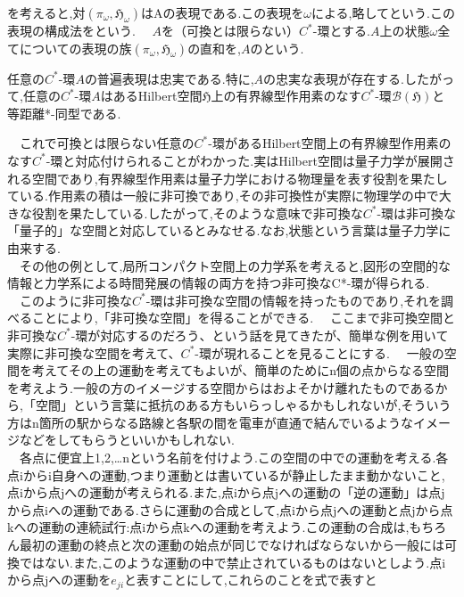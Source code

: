 を考えると,対$\left(\pi_{\omega},\mathfrak{H}_{\omega}\right)$はAの表現である.この表現を$\omega$による,略してという.この表現の構成法をという.
　$A$を（可換とは限らない）$C^*$-環とする.$A$上の状態$\omega$全てについての表現の族$\left(\pi_{\omega},\mathfrak{H}_{\omega}\right)$の直和を,$A$のという.
\begin{theo}
任意の$C^*$-環$A$の普遍表現は忠実である.特に,$A$の忠実な表現が存在する.したがって,任意の$C^*$-環$A$はある{\rm Hilbert}空間$\mathfrak{H}$上の有界線型作用素のなす$C^*$-環$\mathcal{B}\left(\mathfrak{H}\right)$と等距離*-同型である.
\end{theo}
　これで可換とは限らない任意の$C^*$-環があるHilbert空間上の有界線型作用素のなす$C^*$-環と対応付けられることがわかった.実はHilbert空間は量子力学が展開される空間であり,有界線型作用素は量子力学における物理量を表す役割を果たしている.作用素の積は一般に非可換であり,その非可換性が実際に物理学の中で大きな役割を果たしている.したがって,そのような意味で非可換な$C^*$-環は非可換な「量子的」な空間と対応しているとみなせる.なお,状態という言葉は量子力学に由来する.\\
　その他の例として,局所コンパクト空間上の力学系を考えると,図形の空間的な情報と力学系による時間発展の情報の両方を持つ非可換なC*-環が得られる.\\
　このように非可換な$C^*$-環は非可換な空間の情報を持ったものであり,それを調べることにより,「非可換な空間」を得ることができる.
　ここまで非可換空間と非可換な$C^*$-環が対応するのだろう、という話を見てきたが、簡単な例を用いて実際に非可換な空間を考えて、$C^*$-環が現れることを見ることにする.
　一般の空間を考えてその上の運動を考えてもよいが、簡単のためにn個の点からなる空間を考えよう.一般の方のイメージする空間からはおよそかけ離れたものであるから,「空間」という言葉に抵抗のある方もいらっしゃるかもしれないが,そういう方はn箇所の駅からなる路線と各駅の間を電車が直通で結んでいるようなイメージなどをしてもらうといいかもしれない.\\
　各点に便宜上1,2,…nという名前を付けよう.この空間の中での運動を考える.各点iからi自身への運動,つまり運動とは書いているが静止したまま動かないこと,点iから点jへの運動が考えられる.また,点iから点jへの運動の「逆の運動」は点jから点iへの運動である.さらに運動の合成として,点iから点jへの運動と点jから点kへの運動の連続試行:点iから点kへの運動を考えよう.この運動の合成は,もちろん最初の運動の終点と次の運動の始点が同じでなければならないから一般には可換ではない.また,このような運動の中で禁止されているものはないとしよう.点iから点jへの運動を$e_{ji}$と表すことにして,これらのことを式で表すと
